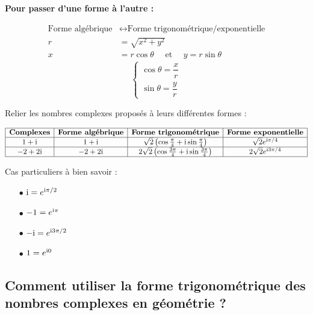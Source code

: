 \medskip

\textbf{Pour passer d'une forme à l'autre :}

\begin{align}
\text{Forme algébrique} &\leftrightarrow \text{Forme trigonométrique/exponentielle} \\
r &= \sqrt{x^2 + y^2}\\
x &= r\cos\theta\quad  \text{ et }\quad  y = r\sin\theta 
\end{align}
\[
\left\{
\begin{array}{l}
\cos\theta = \dfrac{x}{r} \\
\sin\theta = \dfrac{y}{r}
\end{array}
\right.
\]


\begin{example}
Relier les nombres complexes proposés à leurs différentes formes :
\bigskip

$\begin{array}{|c|c|c|c|}
\hline
\textbf{Complexes} & \textbf{Forme algébrique} & \textbf{Forme trigonométrique} & \textbf{Forme exponentielle} \\
\hline
1 + \text{i} & 1 + \text{i} & \sqrt{2}\left(\cos\frac{\pi}{4} + \text{i}\sin\frac{\pi}{4}\right) & \sqrt{2}e^{\text{i}\pi/4} \\
\hline
-2 + 2\text{i} & -2 + 2\text{i} & 2\sqrt{2}\left(\cos\frac{3\pi}{4} + \text{i}\sin\frac{3\pi}{4}\right) & 2\sqrt{2}e^{\text{i}3\pi/4} \\
\hline
\end{array}$
\end{example}

\begin{remark}
Cas particuliers à bien savoir :
\begin{itemize}
\item[$  \bullet$] $\text{i} = e^{\text{i}\pi/2}$
\item[$  \bullet$] $-1 = e^{\text{i}\pi}$
\item[$  \bullet$] $-\text{i} = e^{\text{i}3\pi/2}$
\item[$  \bullet$] $1 = e^{\text{i}0}$
\end{itemize}
\end{remark}

\subsection{Comment utiliser la forme trigonométrique des nombres complexes en géométrie ?}

